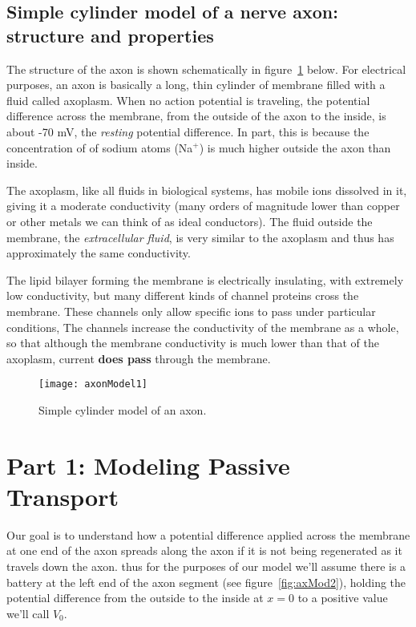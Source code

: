 \subsection*{Simple cylinder model of a nerve axon: structure and properties}


The structure of the axon is shown schematically in figure~\ref{fig:axMod1} below.
For electrical purposes, an axon is basically a long, thin cylinder of membrane filled with a fluid called axoplasm.
When no action potential is traveling, the potential difference across the membrane, from the outside of the axon to the inside, is about -70 mV, the \emph{resting} potential difference.
In part, this is because the concentration of of sodium atoms (Na$^{+}$) is much higher outside the axon than inside.
\par
The axoplasm, like all fluids in biological systems, has mobile ions dissolved in it, giving it a moderate conductivity (many orders of magnitude lower than copper or other metals we can think of as ideal conductors).
The fluid outside the membrane, the \emph{extracellular fluid}, is very similar to the axoplasm and thus has approximately the same conductivity.
\par 
The lipid bilayer forming the membrane is electrically insulating, with extremely low conductivity, but many different kinds of channel proteins cross the membrane.
These channels only allow specific ions to pass under particular conditions,
The channels increase the conductivity of the membrane as a whole, so that although the membrane conductivity is much lower than that of the axoplasm, current \textbf{does pass} through the membrane.

\begin{figure}[hbtp]
	\centering
	\texttt{[image: axonModel1]}
	\caption{Simple cylinder model of an axon.}
	\label{fig:axMod1}
\end{figure}

\section*{Part 1: Modeling Passive Transport}
Our goal is to understand how a potential difference applied across the membrane at one end of the axon spreads along the axon if it is not being regenerated as it travels down the axon.
thus for the purposes of our model we'll assume there is a battery at the left end of the axon segment (see figure~\ref{fig:axMod2}), holding the potential difference from the outside to the inside at $x=0$ to a positive value we'll call $V_{0}$.

